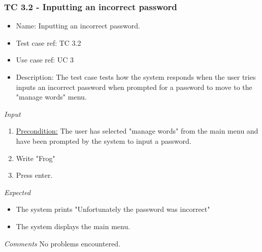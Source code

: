 \documentclass[12pt, letterpaper]{article}
\begin{document}
\subsubsection{TC 3.2 - Inputting an incorrect password}
\begin{itemize}
	\item Name: Inputting an incorrect password.
	\item Test case ref: TC 3.2
	\item Use case ref: UC 3
	\item Description: The test case tests how the system responds when the user tries inputs an incorrect password when prompted for a password to move to the "manage words" menu.
\end{itemize}
\emph{Input}
\begin{enumerate}
	\item \underline{Precondition:} The user has selected "manage words" from the main menu and have been prompted by the system to input a password.
	\item Write "Frog"
	\item Press enter.
\end{enumerate}
\emph{Expected}
\begin{itemize}
	\item The system prints "Unfortunately the password was incorrect"
	\item The system displays the main menu.
\end{itemize}
\begin{Form}
	\newline
	\newline
\end{Form}
\newline
\emph{Comments}
No problems encountered.
\end{document}
